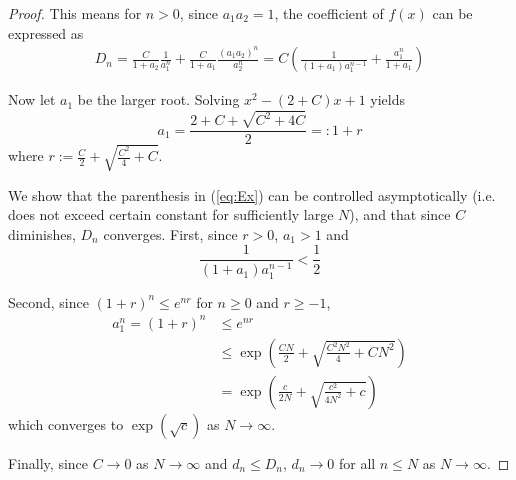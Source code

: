 \documentclass{article}
\begin{document}
\begin{proof}
This means for $n>0$, since $a_1a_2=1$, the coefficient of $f(x)$ can be expressed as 
\begin{align}
D_n = 
\frac{C}{1+a_2}\frac{1}{a_1^{n}} + \frac{C}{1+a_1}\frac{(a_1a_2)^{n}}{a_2^{n}} =
C \left(
\frac{1}{(1+a_1)a_1^{n-1}} + \frac{a_1^{n}}{1+a_1}
\right)
\label{eq:Ex}
\end{align}


Now let $a_1$ be the larger root. 
Solving $x^2-(2+C)x+1$ yields 
$$a_1
= \frac{2+C + \sqrt{C^2 + 4 C}}{2}
=: 1+r$$
where $r:=\frac{C}{2}+\sqrt{\frac{C^2}{4} + C}$.

We show that the parenthesis in (\ref{eq:Ex}) can be controlled asymptotically (i.e. does not exceed certain constant for sufficiently large $N$), and that since $C$ diminishes, $D_n$ converges. 
First, since $r>0$, $a_1>1$ and
$$\frac{1}{(1+a_1)a_1^{n-1}} < \frac{1}{2}$$

Second, since $(1+r)^n\leq e^{nr}$ for $n\geq0$ and $r\geq-1$,
\begin{align*}
a_1^n=(1+r)^{n}
&\leq e^{nr} \\
&\leq \exp\left({\frac{CN}{2} + \sqrt{\frac{C^2N^2}{4} + CN^2}}\right) \\
&= \exp\left({\frac{c}{2N} + \sqrt{\frac{c^2}{4N^2} + c}}\right)
\end{align*}
which converges to $\exp(\sqrt{c})$ as $N\rightarrow\infty$. 

Finally, since $C\rightarrow 0$ as $N\rightarrow\infty$ and $d_n\leq D_n$, $d_n\rightarrow0$ for all $n\leq N$ as $N\rightarrow\infty$. 
\end{proof}
\end{document}
